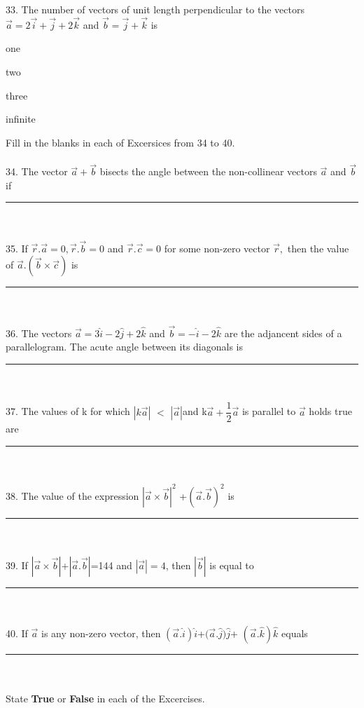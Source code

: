 \documentclass{article}
\newcommand{\choice}{\item}
\begin{document}
33. The number of vectors of unit length perpendicular to the vectors $\overrightarrow{a}=2\overrightarrow{i}+\overrightarrow{j}+2\overrightarrow{k}$ and $\overrightarrow{b}=\overrightarrow{j}+\overrightarrow{k}$ is
\begin{choices}[fourcol]
\choice one
\choice two
\choice three
\choice infinite
\end{choices}
Fill in the blanks in each of Excersices from 34 to 40.
\\
\\
34. The vector $\overrightarrow{a}+\overrightarrow{b}$ bisects the angle between the non-collinear vectors $\overrightarrow{a}$ and $\overrightarrow{b}$ if \rule{1cm}{0.15mm}
\\
\\
35. If $\overrightarrow{r}.\overrightarrow{a}=0, \overrightarrow{r}.\overrightarrow{b}=0$ and $\overrightarrow{r}.\overrightarrow{c}=0$ for some non-zero vector $\overrightarrow{r},$ then the value of $\overrightarrow{a}.(\overrightarrow{b}\times\overrightarrow{c})$ is \rule{1cm}{0.15mm}
\\
\\
36. The vectors $\overrightarrow{a}=3\hat{i}-2\hat{j}+2\hat{k}$ and $\overrightarrow{b}=-\hat{i}-2\hat{k}$ are the adjancent sides of a parallelogram. The acute angle between its diagonals is \rule{1cm}{0.15mm}
\\
\\
37. The values of k for which $|k\overrightarrow{a}|$ $<$ $|\overrightarrow{a}|$and k$\overrightarrow{a}+\dfrac{1}{2}\overrightarrow{a}$ is parallel to $\overrightarrow{a}$ holds true are \rule{1cm}{0.15mm}
\\
\\
38. The value of the expression $|\overrightarrow{a}\times\overrightarrow{b}|^2$ +$ (\overrightarrow{a}.\overrightarrow{b})^2$ is \rule{1cm}{0.15mm}
\\
\\
39. If $|\overrightarrow{a}\times\overrightarrow{b}|$+$|\overrightarrow{a}.\overrightarrow{b}|$=144 and $|\overrightarrow{a}|=4$, then $|\overrightarrow{b}|$ is equal to \rule{1cm}{0.15mm}
\\
\\
40. If $\overrightarrow{a}$ is  any non-zero vector, then $(\overrightarrow{a}.\hat{i})$$\hat{i}$+$(\overrightarrow{a}$.$\hat{j})\hat{j}$+ $(\overrightarrow{a}.\hat{k})$$\hat{k}$ equals \rule{1cm}{0.15mm}
\\
\\
State \textbf{True} or \textbf{False} in each of the Excercises.
\end{document}
